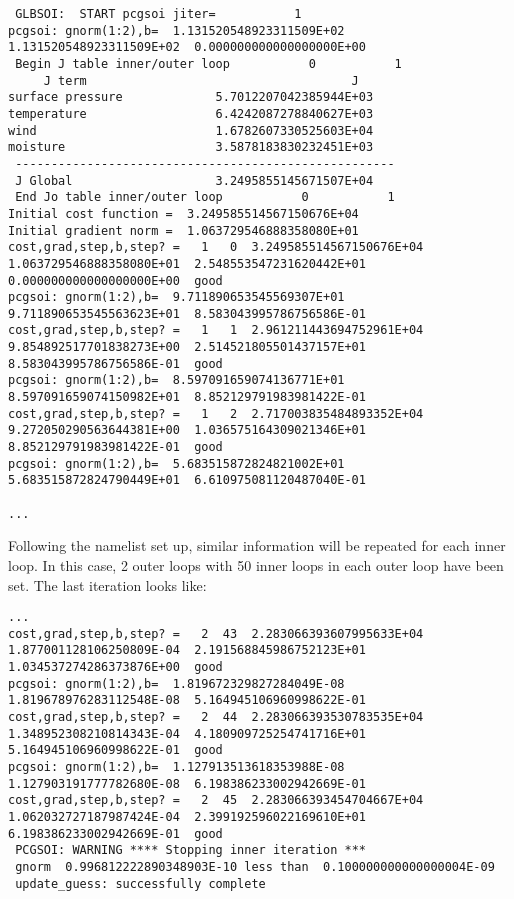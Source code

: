 \begin{enumerate}
\begin{tiny}
\begin{verbatim}
 GLBSOI:  START pcgsoi jiter=           1
pcgsoi: gnorm(1:2),b=  1.131520548923311509E+02  1.131520548923311509E+02  0.000000000000000000E+00
 Begin J table inner/outer loop           0           1
     J term                                     J
surface pressure             5.7012207042385944E+03
temperature                  6.4242087278840627E+03
wind                         1.6782607330525603E+04
moisture                     3.5878183830232451E+03
 -----------------------------------------------------
 J Global                    3.2495855145671507E+04
 End Jo table inner/outer loop           0           1
Initial cost function =  3.249585514567150676E+04
Initial gradient norm =  1.063729546888358080E+01
cost,grad,step,b,step? =   1   0  3.249585514567150676E+04  1.063729546888358080E+01  2.548553547231620442E+01  0.000000000000000000E+00  good
pcgsoi: gnorm(1:2),b=  9.711890653545569307E+01  9.711890653545563623E+01  8.583043995786756586E-01
cost,grad,step,b,step? =   1   1  2.961211443694752961E+04  9.854892517701838273E+00  2.514521805501437157E+01  8.583043995786756586E-01  good
pcgsoi: gnorm(1:2),b=  8.597091659074136771E+01  8.597091659074150982E+01  8.852129791983981422E-01
cost,grad,step,b,step? =   1   2  2.717003835484893352E+04  9.272050290563644381E+00  1.036575164309021346E+01  8.852129791983981422E-01  good
pcgsoi: gnorm(1:2),b=  5.683515872824821002E+01  5.683515872824790449E+01  6.610975081120487040E-01

...
\end{verbatim}
\end{tiny}

Following the namelist set up, similar information will be repeated for each inner loop.  In this case, 2 outer loops with 50 inner loops in each outer loop have been set.  The last iteration looks like:

\begin{tiny}
\begin{verbatim}
...
cost,grad,step,b,step? =   2  43  2.283066393607995633E+04  1.877001128106250809E-04  2.191568845986752123E+01  1.034537274286373876E+00  good
pcgsoi: gnorm(1:2),b=  1.819672329827284049E-08  1.819678976283112548E-08  5.164945106960998622E-01
cost,grad,step,b,step? =   2  44  2.283066393530783535E+04  1.348952308210814343E-04  4.180909725254741716E+01  5.164945106960998622E-01  good
pcgsoi: gnorm(1:2),b=  1.127913513618353988E-08  1.127903191777782680E-08  6.198386233002942669E-01
cost,grad,step,b,step? =   2  45  2.283066393454704667E+04  1.062032727187987424E-04  2.399192596022169610E+01  6.198386233002942669E-01  good
 PCGSOI: WARNING **** Stopping inner iteration ***
 gnorm  0.996812222890348903E-10 less than  0.100000000000000004E-09
 update_guess: successfully complete
\end{verbatim}
\end{tiny}


\end{enumerate}
